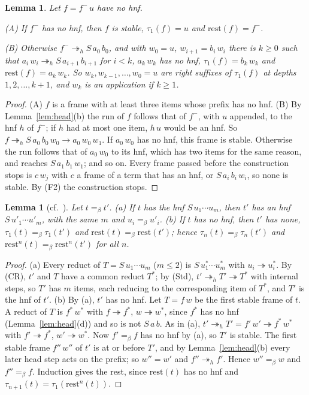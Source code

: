 \documentclass[11pt]{amsart}
\newtheorem{lemma}[theorem]{Lemma}
\theoremstyle{definition}
\newcommand{\red}{\twoheadrightarrow}
\newcommand{\hred}{\twoheadrightarrow_h}
\newcommand{\conv}{=_\beta}
\newcommand{\rest}{\mathrm{rest}}
\begin{document}
\begin{lemma}\label{lem:moves}
Let $f=f^-\,u$ have no hnf.

\textup{(A)} If $f^-$ has no hnf, then $f$ is stable, $\tau_1(f)=u$ and $\rest(f)=f^-$.

\textup{(B)} Otherwise $f^-\hred S\,a_0\,b_0$, and with $w_0=u$, $w_{i+1}=b_i\,w_i$ there is $k\ge0$
such that $a_i\,w_i\hred S\,a_{i+1}\,b_{i+1}$ for $i<k$, $a_k\,w_k$ has no hnf, $\tau_1(f)=b_k\,w_k$
and $\rest(f)=a_k\,w_k$. So $w_k,w_{k-1},\dots,w_0=u$ are right suffixes of $\tau_1(f)$ at depths
$1,2,\dots,k+1$, and $w_k$ is an application if $k\ge1$.
\end{lemma}

\begin{proof}
(A) $f$ is a frame with at least three items whose prefix has no hnf. (B) By
Lemma~\ref{lem:head}(b) the run of $f$ follows that of $f^-$, with $u$ appended, to the hnf $h$ of
$f^-$; if $h$ had at most one item, $h\,u$ would be an hnf. So $f\hred S\,a_0\,b_0\,w_0\to
a_0\,w_0\,w_1$. If $a_0\,w_0$ has no hnf, this frame is stable. Otherwise the run follows that of
$a_0\,w_0$ to its hnf, which has two items for the same reason, and reaches
$S\,a_1\,b_1\,w_1$; and so on. Every frame passed before the construction stops is $c\,w_j$ with $c$
a frame of a term that has an hnf, or $S\,a_i\,b_i\,w_i$, so none is stable. By (F2) the
construction stops.
\end{proof}

\begin{lemma}[cf.~{\citep[Lemma~4]{s6}}]\label{lem:inv}
Let $t\conv t'$. \textup{(a)} If $t$ has the hnf $S\,u_1\cdots u_m$, then $t'$ has an hnf
$S\,u'_1\cdots u'_m$, with the same $m$ and $u_i\conv u'_i$. \textup{(b)} If $t$ has no hnf, then
$t'$ has none, $\tau_1(t)\conv\tau_1(t')$ and $\rest(t)\conv\rest(t')$; hence
$\tau_n(t)\conv\tau_n(t')$ and $\rest^n(t)\conv\rest^n(t')$ for all $n$.
\end{lemma}

\begin{proof}
(a) Every reduct of $T=S\,u_1\cdots u_m$ ($m\le2$) is $S\,u^*_1\cdots u^*_m$ with $u_i\red u_i^*$.
By (CR), $t'$ and $T$ have a common reduct $T^*$; by (Std), $t'\hred T'\red T^*$ with internal steps,
so $T'$ has $m$ items, each reducing to the corresponding item of $T^*$, and $T'$ is the hnf of $t'$.
(b) By (a), $t'$ has no hnf. Let $T=f\,w$ be the first stable frame of $t$. A reduct of $T$ is
$f^*\,w^*$ with $f\red f^*$, $w\red w^*$, since $f^*$ has no hnf (Lemma~\ref{lem:head}(d)) and so is not
$S\,a\,b$. As in (a), $t'\hred T'=f'\,w'\red f^*\,w^*$ with $f'\red f^*$, $w'\red w^*$. Now
$f'\conv f$ has no hnf by (a), so $T'$ is stable. The first stable frame $f''\,w''$ of $t'$ is at
or before $T'$, and by Lemma~\ref{lem:head}(b) every later head step acts on the prefix; so $w''=w'$
and $f''\hred f'$. Hence $w''\conv w$ and $f''\conv f$. Induction gives the rest, since $\rest(t)$ has
no hnf and $\tau_{n+1}(t)=\tau_1(\rest^n(t))$.
\end{proof}
\end{document}
